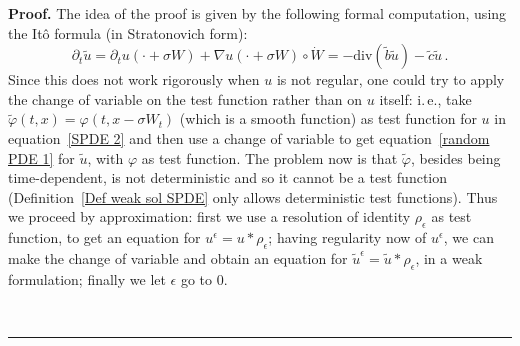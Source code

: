 \documentclass[a4paper,10pt]{article}
\newenvironment{proof}[1][Proof]{\noindent\textbf{#1.} }{\ \rule{0.5em}{0.5em}}
\newcommand{\diverg}{\mathrm{div}}
\newcommand{\td}{\tilde}
\newcommand{\eps}{\epsilon}
\begin{document}
\begin{proof}
The idea of the proof is given by the following formal computation, using the It\^o formula (in Stratonovich form):
\begin{equation}
\partial_t\td{u}=\partial_tu(\cdot+\sigma W)+\nabla u(\cdot+\sigma W)\circ\dot{W}=-\diverg(\td{b}\td{u})-\td{c}\td{u} \, .\label{formalequiv}
\end{equation}
Since this does not work rigorously when $u$ is not regular, one could try to apply the change of variable on the test function rather than on $u$ itself: i.\,e., take $\td{\varphi}(t,x)=\varphi(t,x-\sigma W_t)$ (which is a smooth function) as test function for $u$ in equation~\eqref{SPDE 2} and then use a change of variable to get equation~\eqref{random PDE 1} for $\td{u}$, with $\varphi$ as test function. The problem now is that $\td{\varphi}$, besides being time-dependent, is not deterministic and so it cannot be a test function (Definition~\ref{Def weak sol SPDE} only allows deterministic test functions). Thus we proceed by approximation: first we use a resolution of identity $\rho_\eps$ as test function, to get an equation for $u^\eps=u*\rho_\eps$; having regularity now of $u^\eps$, we can make the change of variable and obtain an equation for $\td{u}^\eps=\td{u}*\rho_\eps$, in a weak formulation; finally we let $\eps$ go to $0$.


\end{proof}
\end{document}
